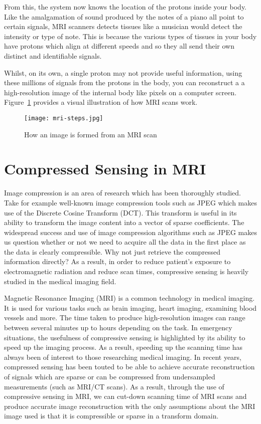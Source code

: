 \documentclass[titlepage,oneside, 12pt]{book}
\theoremstyle{break}
\begin{document}
From this, the system now knows the location of the protons inside your body. Like the amalgamation of sound produced by the notes of a piano all point to certain signals, MRI scanners detects tissues like a musician would detect the intensity or type of note. This is because the various types of tissues in your body have protons which align at different speeds and so they all send their own distinct and identifiable signals.

Whilst, on its own, a single proton may not provide useful information, using these millions of signals from the protons in the body, you can reconstruct a a high-resolution image of the internal body like pixels on a computer screen. Figure~\ref{fig:MRIScan} provides a visual illustration of how MRI scans work.  
 
\begin{figure}[t!]
\centering
\centerline{\texttt{[image: mri-steps.jpg]}}
\caption{How an image is formed from an MRI scan\cite{HSW-MRI}}
\label{fig:MRIScan}
\end{figure}


\clearpage

\section{Compressed Sensing in MRI}
Image compression is an area of research which has been thoroughly studied. Take for example well-known image compression tools such as JPEG which makes use of the Discrete Cosine Transform (DCT). This transform is useful in its ability to transform the image content into a vector of sparse coefficients. The widespread success and use of image compression algorithms such as JPEG makes us question whether or not we need to acquire all the data in the first place as the data is clearly compressible. Why not just retrieve the compressed information directly? As a result, in order to reduce patient's exposure to electromagnetic radiation and reduce scan times, compressive sensing is heavily studied in the medical imaging field.

Magnetic Resonance Imaging (MRI) is a common technology in medical imaging. It is used for various tasks such as brain imaging, heart imaging, examining blood vessels and more. The time taken to produce high-resolution images can range between several minutes up to hours depending on the task. In emergency situations, the usefulness of compressive sensing is highlighted by its ability to speed up the imaging process. As a result, speeding up the scanning time has always been of interest to those researching medical imaging. In recent years, compressed sensing has been touted to be able to achieve accurate reconstruction of signals which are sparse or can be compressed from undersampled measurements (such as MRI/CT scans). As a result, through the use of compressive sensing in MRI, we can cut-down scanning time of MRI scans and produce accurate image reconstruction with the only assumptions about the MRI image used is that it is compressible or sparse in a transform domain. 
\end{document}
